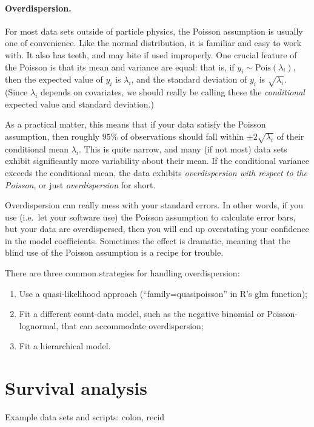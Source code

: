 \documentclass[11pt]{article}
\newcommand{\1}[1]{\mathbf{1}_{\{ {#1} \}}}
\begin{document}
\paragraph{Overdispersion.}  For most data sets outside of particle physics, the Poisson assumption is usually one of convenience.  Like the normal distribution, it is familiar and easy to work with.  It also has teeth, and may bite if used improperly.  One crucial feature of the Poisson is that its mean and variance are equal: that is, if $y_i \sim \mbox{Pois}(\lambda_i)$, then the expected value of $y_i$ is $\lambda_i$, and the standard deviation of $y_i$ is $\sqrt{\lambda_i}$.  (Since $\lambda_i$ depends on covariates, we should really be calling these the \textit{conditional} expected value and standard deviation.)

As a practical matter, this means that if your data satisfy the Poisson assumption, then roughly $95\%$ of observations should fall within $\pm 2 \sqrt{\lambda_i}$ of their conditional mean $\lambda_i$.  This is quite narrow, and many (if not most) data sets exhibit significantly more variability about their mean.  If the conditional variance exceeds the conditional mean, the data exhibits \textit{overdispersion with respect to the Poisson}, or just \textit{overdispersion} for short.

Overdispersion can really mess with your standard errors.  In other words, if you use (i.e.~let your software use) the Poisson assumption to calculate error bars, but your data are overdispersed, then you will end up overstating your confidence in the model coefficients.  Sometimes the effect is dramatic, meaning that the blind use of the Poisson assumption is a recipe for trouble.

There are three common strategies for handling overdispersion:
\begin{enumerate}
\item Use a quasi-likelihood approach (``family=quasipoisson'' in R's glm function);
\item Fit a different count-data model, such as the negative binomial or Poisson-lognormal, that can accommodate overdispersion;
\item Fit a hierarchical model.
\end{enumerate}


\section{Survival analysis}
Example data sets and scripts: colon, recid
\end{document}
